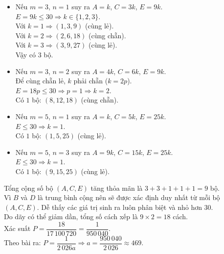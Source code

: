 \begin{ex}
{\begin{itemize}
			Để $A$, $C$, $E$ cùng chẵn lẻ thì $k$ phải chẵn ($k=2p$). \\
			$E = 8p \le 30 \Rightarrow p \in \{1, 2, 3\}$.\\
			Có $3$ bộ: $(2,4,8)$, $(4,8,16)$, $(6,12,24)$.
			\item  Nếu $m=3$, $n=1$ suy ra $A=k$, $C=3k$, $E=9k$.\\
			$E = 9k \le 30 \Rightarrow k \in \{1, 2, 3\}$.\\
			Với $k=1 \Rightarrow (1,3,9)$ (cùng lẻ).\\
			Với $k=2 \Rightarrow (2,6,18)$ (cùng chẵn).\\
			Với $k=3 \Rightarrow (3,9,27)$ (cùng lẻ).\\
			Vậy có $3$ bộ.
			\item  Nếu $m=3$, $n=2$ suy ra $A=4k$, $C=6k$, $E=9k$.\\
			Để cùng chẵn lẻ, $k$ phải chẵn ($k=2p$).\\
			$E = 18p \le 30 \Rightarrow p=1 \Rightarrow k=2$.\\
			Có $1$ bộ: $(8,12,18)$ (cùng chẵn).
			\item  Nếu $m=5$, $n=1$ suy ra $A=k$, $C=5k$, $E=25k$.\\
			$E \le 30 \Rightarrow k=1$.\\
			Có $1$ bộ: $(1,5,25)$ (cùng lẻ).
			\item  Nếu $m=5$, $n=3$ suy ra $A=9k$, $C=15k$, $E=25k$.\\
			$E \le 30 \Rightarrow k=1$.\\
			Có $1$ bộ: $(9,15,25)$ (cùng lẻ).
		\end{itemize}
		Tổng cộng số bộ $(A,C,E)$ tăng thỏa mãn là $3 + 3 + 1 + 1 + 1 = 9$ bộ.\\
		Vì $B$ và $D$ là trung bình cộng nên sẽ được xác định duy nhất từ mỗi bộ $(A,C,E)$. Dễ thấy các giá trị sinh ra luôn phân biệt và nhỏ hơn $30$.\\
		Do dãy có thể giảm dần, tổng số cách xếp là $9 \times 2 = 18$ cách.\\
		Xác suất $P = \dfrac{18}{17\,100\,720} = \dfrac{1}{950\,040}$.\\
		Theo bài ra: $P = \dfrac{1}{2\,026 a} \Rightarrow a = \dfrac{950\,040}{2\,026} \approx 469$.
	}
\end{ex}